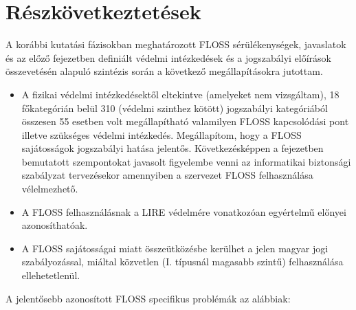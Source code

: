 \documentclass[12pt,magyar,a4paper,oneside]{scrreprt}
\begin{document}
\hypertarget{ruxe9szkuxf6vetkeztetuxe9sek-3}{%
\section{Részkövetkeztetések}\label{ruxe9szkuxf6vetkeztetuxe9sek-3}}

A korábbi kutatási fázisokban meghatározott FLOSS sérülékenységek,
javaslatok és az előző fejezetben definiált védelmi intézkedések és a
jogszabályi előírások összevetésén alapuló szintézis során a következő
megállapításokra jutottam.

\begin{itemize}
\item
  A fizikai védelmi intézkedésektől eltekintve (amelyeket nem
  vizsgáltam), 18 főkategórián belül 310 (védelmi szinthez kötött)
  jogszabályi kategóriából összesen 55 esetben volt megállapítható
  valamilyen FLOSS kapcsolódási pont illetve szükséges védelmi
  intézkedés. Megállapítom, hogy a FLOSS sajátosságok jogszabályi hatása
  jelentős. Következésképpen a fejezetben bemutatott szempontokat
  javasolt figyelembe venni az informatikai biztonsági szabályzat
  tervezésekor amennyiben a szervezet FLOSS felhasználása vélelmezhető.
\item
  A FLOSS felhasználásnak a LIRE védelmére vonatkozóan egyértelmű
  előnyei azonosíthatóak.
\item
  A FLOSS sajátosságai miatt összeütközésbe kerülhet a jelen magyar jogi
  szabályozással, miáltal közvetlen (I. típusnál magasabb szintű)
  felhasználása ellehetetlenül.
\end{itemize}

A jelentősebb azonosított FLOSS specifikus problémák az alábbiak:
\end{document}
